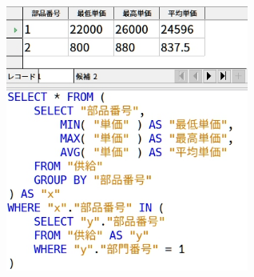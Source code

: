 \documentclass[a4paper,10pt]{jsarticle}
\begin{document}
\section{}
\begin{figure}[H]
  \centering
  \includegraphics[width=8cm]{./(10).png}
  \caption{}
  \label{}
\end{figure}
\end{document}
